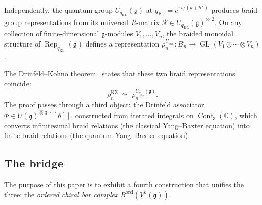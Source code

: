 \documentclass[11pt,reqno]{amsart}
\theoremstyle{definition}
\theoremstyle{remark}
\DeclareMathOperator{\Conf}{Conf}
\DeclareMathOperator{\Rep}{Rep}
\DeclareMathOperator{\GL}{GL}
\newcommand{\fg}{\mathfrak{g}}
\newcommand{\CC}{\mathbb{C}}
\newcommand{\kp}{k + h^{\vee}}
\newcommand{\cR}{\mathcal{R}}
\numberwithin{equation}{section}
\begin{document}
Independently, the quantum group $U_{q_{\mathrm{KL}}}(\fg)$ at
$q_{\mathrm{KL}} = e^{\pi i/(\kp)}$ produces braid group representations
from its universal $R$-matrix
$\cR \in U_{q_{\mathrm{KL}}}(\fg)^{\widehat{\otimes}\,2}$.  On any
collection of finite-dimensional $\fg$-modules
$V_1, \ldots, V_n$, the braided monoidal structure of
$\Rep_{q_{\mathrm{KL}}}(\fg)$ defines a representation
$\rho_n^{U_{q_{\mathrm{KL}}}} \colon B_n
\to \GL(V_1 \otimes \cdots \otimes V_n)$.

The Drinfeld--Kohno theorem~\cite{Kohno87, Drinfeld90}
states that these two braid representations coincide:
\begin{equation}\label{eq:dk-theorem-intro}
\rho_n^{\mathrm{KZ}}
\;\simeq\;
\rho_n^{U_{q_{\mathrm{KL}}}(\fg)}.
\end{equation}
The proof passes through a third object: the Drinfeld
associator $\Phi \in U(\fg)^{\widehat{\otimes}\,3}[\![\hbar]\!]$,
constructed from iterated integrals on
$\Conf_3(\CC)$, which converts infinitesimal braid
relations (the classical Yang--Baxter equation) into
finite braid relations (the quantum Yang--Baxter equation).

\subsection{The bridge}

The purpose of this paper is to exhibit a fourth
construction that unifies the three:
the \emph{ordered chiral bar complex}
$B^{\mathrm{ord}}(V^k(\fg))$.
\end{document}
